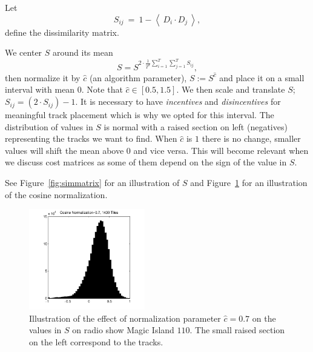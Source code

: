 \documentclass[twocolumn]{article}
\begin{document}
	Let
	\[
	S_{ij} ~=~ 1-\left<~D_{i} \cdot D_{j}~\right>,
	\] define the dissimilarity matrix.
	
	We center $S$ around its mean \[
	S = S^{2 \cdot \frac{1}{T^2}\sum_{i=1}^T \sum_{j=1}^T S_{ij}},
	\] then normalize it by $\hat c$ (an algorithm parameter), $S:=S^{\hat c}$ and place it on a small interval with mean $0$. Note that $\hat c \in [0.5,1.5]$. We then scale and translate $S$; $S_{ij} = \left( 2 \cdot S_{ij} \right)-1$. It is necessary to have \textit{incentives} and \textit{disincentives} for meaningful track placement which is why we opted for this interval. The distribution of values in $S$ is normal with a raised section on left (negatives) representing the tracks we want to find. When $\hat c$ is $1$ there is no change, smaller values will shift the mean above $0$ and vice versa. This will become relevant when we discuss cost matrices as some of them depend on the sign of the value in $S$. 
	
	See Figure~\ref{fig:simmatrix} for an illustration of $S$ and Figure~\ref{fig:cosine_norm} for an illustration of the cosine normalization.
	
		\begin{figure}
			\centering
			\includegraphics[width=0.45\textwidth]{images/cosinesmagic110}
			
			\caption{Illustration of the effect of normalization parameter $\hat c=0.7$ on the values in $S$ on radio show Magic Island $110$. The small raised section on the left correspond to the tracks.}
			\label{fig:cosine_norm}
		\end{figure} 
	
\end{document}
